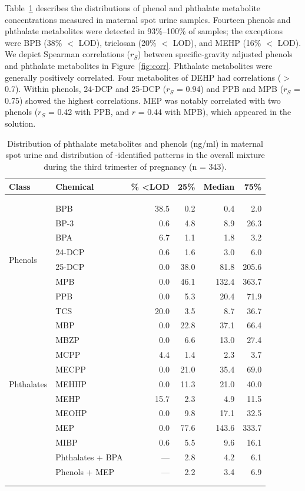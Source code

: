 Table~\ref{tab:conc} describes the distributions of phenol and phthalate metabolite concentrations measured in maternal spot urine samples. Fourteen phenols and phthalate metabolites were detected in 93\%--100\% of samples; the exceptions were BPB (38\% $<$ LOD), triclosan (20\% $<$ LOD), and MEHP (16\% $<$ LOD). We depict Spearman correlations ($r_S$) between specific-gravity adjusted phenols and phthalate metabolites in Figure~\ref{fig:corr}. Phthalate metabolites were generally positively correlated. Four metabolites of DEHP had correlations ($>$ 0.7). Within phenols, 24-DCP and 25-DCP ($r_S$ = 0.94) and PPB and MPB ($r_S$ = 0.75) showed the highest correlations. MEP was notably correlated with two phenols ($r_S$ = 0.42 with PPB, and $r$ = 0.44 with MPB), which appeared in the \bnmf solution.

\begingroup
\renewcommand{\arraystretch}{1.25}
\begin{table}[!ht] \centering 
  \caption[Distribution of phthalate metabolites and phenols]{Distribution of phthalate metabolites and phenols (ng/ml) in maternal spot urine and distribution of \bnmfc-identified patterns in the overall mixture during the third trimester of pregnancy (n = 343).}
  \label{tab:conc} 
\begin{tabular}{@{\extracolsep{5pt}} llrrrr} 
Class & Chemical & \% \textless LOD & 25\% & Median & 75\% \\ 
\hline 
\\[-3ex] \hline \\[-2.5ex]
\multirow{8}{*}{Phenols} & BPB    & 38.5 & 0.2  & 0.4 & 2.0 \\ 
& BP-3   & 0.6 & 4.8  & 8.9 & 26.3 \\ 
& BPA    & 6.7 & 1.1  & 1.8 & 3.2 \\ 
& 24-DCP & 0.6 & 1.6  & 3.0 & 6.0 \\ 
& 25-DCP & 0.0 & 38.0 & 81.8 & 205.6 \\ 
& MPB    & 0.0 & 46.1 & 132.4 & 363.7 \\ 
& PPB    & 0.0 & 5.3  & 20.4 & 71.9 \\ 
& TCS    & 20.0 & 3.5  & 8.7 & 36.7 \\ 
\hline
\multirow{9}{*}{Phthalates} & MBP    & 0.0 & 22.8 & 37.1 & 66.4 \\ 
& MBZP   & 0.0 & 6.6  & 13.0 & 27.4 \\ 
& MCPP   & 4.4 & 1.4  & 2.3 & 3.7 \\ 
& MECPP  & 0.0 & 21.0 & 35.4 & 69.0 \\ 
& MEHHP  & 0.0 & 11.3 & 21.0 & 40.0 \\ 
& MEHP   & 15.7 & 2.3  & 4.9 & 11.5 \\ 
& MEOHP  & 0.0 & 9.8  & 17.1 & 32.5 \\ 
& MEP    & 0.0 & 77.6 & 143.6 & 333.7 \\ 
& MIBP   & 0.6 & 5.5  & 9.6 & 16.1 \\ 
\hline 
 & Phthalates + BPA & --- & 2.8 & 4.2 & 6.1 \\
 & Phenols + MEP & --- & 2.2 & 3.4 & 6.9 \\
\hline
\\[-3ex] \hline \\[-2.5ex]
\end{tabular} 
\end{table} 
